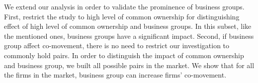 	
	
	We extend our analysis in order to validate the prominence of business groups. First, restrict the study to high level of common ownership for distinguishing effect of high level of common ownership and business groups. 
	In this subset, like the mentioned ones, business groups have a significant impact.
	Second, if business group affect co-movement, there is no need to restrict our investigation to commonly hold pairs. In order to distinguish the impact of common ownership and business group, we built all possible pairs in the market.
	We show that for all the firms in the market, business group can increase firms' co-movement. 
	
	
	
	

%